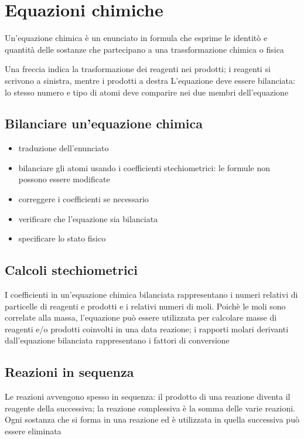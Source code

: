 \documentclass[a4paper,11pt]{report}
\begin{document}
\section{Equazioni chimiche}
Un'equazione chimica è un enunciato in formula che esprime le identitò e quantità delle sostanze che partecipano a una trassformazione chimica o fisica \newline

Una freccia indica la trasformazione dei reagenti nei prodotti; i reagenti si scrivono a sinistra, mentre i prodotti a destra \newline
L'equazione deve essere bilanciata: lo stesso numero e tipo di atomi deve comparire nei due membri dell'equazione 

\subsection*{Bilanciare un'equazione chimica}
\begin{itemize}
	\item traduzione dell'enunciato
 \item bilanciare gli atomi usando i coefficienti stechiometrici: le formule non possono essere modificate
 \item correggere i coefficienti se necessario
 \item verificare che l'equazione sia bilanciata
 \item specificare lo stato fisico
\end{itemize}

\subsection*{Calcoli stechiometrici}
I coefficienti in un'equazione chimica bilanciata rappresentano i numeri relativi di particelle di reagenti e prodotti e i relativi numeri di moli. Poichè le moli sono correlate alla massa, l'equazione può essere utilizzata per calcolare masse di reagenti e/o prodotti coinvolti in una data reazione; i rapporti molari derivanti dall'equazione bilanciata rappresentano i fattori di conversione 

\subsection*{Reazioni in sequenza}
Le reazioni avvengono spesso in sequenza: il prodotto di una reazione diventa il reagente della successiva; la reazione complessiva è la somma delle varie reazioni. Ogni sostanza che si forma in una reazione ed è utilizzata in quella successiva può essere eliminata
\end{document}
